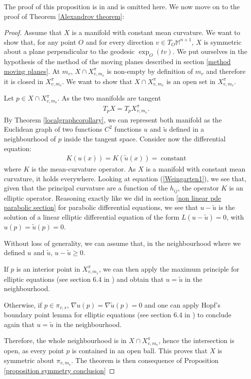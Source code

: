 The proof of this proposition is in \cite{italiani} and is omitted here. We now move on to the proof of Theorem \ref{Alexandrov theorem}:
\begin{proof}
	Assume that $X$ is a manifold with constant mean curvature. 
	We want to show that, for any point $O$ and for every direction $v\in T_O\mathbb{M}^{n+1}$, $X$ is symmetric about a plane perpendicular to the geodesic $\exp_O(tv)$. We put ourselves in the hypothesis of the method of the moving planes described in section \ref{method moving planes}. At $m_v$, $X \cap X_{v, m_v}^\pi$ is non-empty by definition of $m_v$ and therefore it is closed in $X_{v, m_v}^\pi$. We want to show that  $X \cap X_{v, m_v}^\pi$ is an open set in $X_{v, m_v}^\pi$. 
	
	Let $p\in X\cap X_{v, m_v}^\pi$. As the two manifolds are tangent
	\begin{align*}
		T_p X=T_p X_{v, m_v}^\pi.
	\end{align*} By Theorem \ref{localgraphcorollary}, we can represent both manifold as the Euclidean graph of two functions $C^2$ functions $u$ and $\tilde{u}$ defined in a neighbourhood of $p$ inside the tangent space. Consider now the differential equation: 
	\begin{align*}
		K(u(x))=K(\tilde{u}(x))=\;\mathrm{constant} 
	\end{align*}
	where $K$ is the mean-curvature operator. As $X$ is a manifold with constant mean curvature, it holds everywhere. 
	Looking at equation (\ref{Weingarten1}), we see that, given that the principal curvature are a function of the $h_{ij}$, the operator $K$ is an elliptic operator. Reasoning exactly like we did in section \ref{non linear pde parabolic section} for parabolic differential equations, we see that $u-\tilde{u}$ is the solution of a linear elliptic differential equation of the form $L (u-\tilde{u})=0$, with $u(p)=\tilde{u}(p)=0$. 
	
	Without loss of generality, we can assume that, in the neighbourhood where we defined $u$ and $\tilde{u}$, $u-\tilde{u}\geq 0$. 
	
	If $p$ is an interior point in $X_{v, m_v}^\pi$, we can then apply the maximum principle for elliptic equations (see section 6.4 in \cite{Evans}) and obtain that  $u=\tilde{u}$ in the neighbourhood. 
	
	Otherwise, if $p\in\pi_{v,s}$, $\nabla u (p)=\nabla \tilde{u} (p)=0$ and one can apply Hopf's boundary point lemma for elliptic equations (see section 6.4 in \cite{Evans}) to conclude again that $u=\tilde{u}$ in the neighbourhood.
	
	Therefore, the whole neighbourhood is in $X\cap X_{v, m_v}^\pi$, hence the intersection is open, as every point $p$ is contained in an open ball. This proves that $X$ is symmetric about $\pi_{v, m_v}$. The theorem is then consequence of Proposition \ref{proposition symmetry conclusion}
\end{proof}

